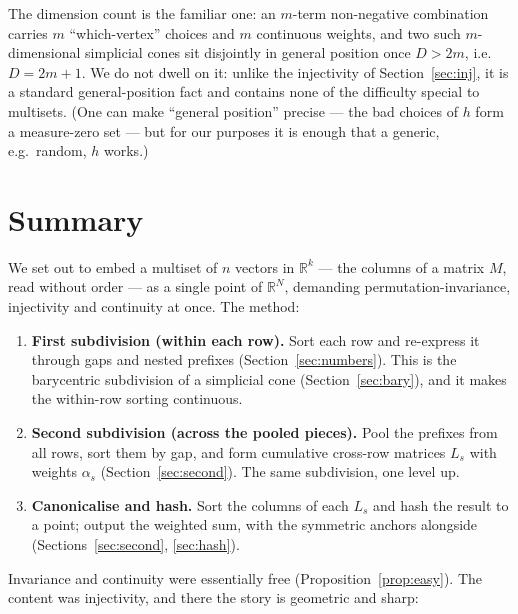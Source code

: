 \documentclass[11pt,a4paper]{article}
\theoremstyle{definition}
\theoremstyle{plain}
\newcommand{\R}{\mathbb{R}}
\begin{document}
\noindent
The dimension count is the familiar one: an $m$-term non-negative combination
carries $m$ ``which-vertex'' choices and $m$ continuous weights, and two such
$m$-dimensional simplicial cones sit disjointly in general position once
$D>2m$, i.e.\
$D=2m+1$. We do not dwell on it: unlike the injectivity of
Section~\ref{sec:inj}, it is a standard general-position fact and contains none
of the difficulty special to multisets. (One can make ``general position''
precise --- the bad choices of $h$ form a measure-zero set --- but for our
purposes it is enough that a generic, e.g.\ random, $h$ works.)

\section{Summary}
\label{sec:summary}

We set out to embed a multiset of $n$ vectors in $\R^k$ --- the columns of a
matrix $M$, read without order --- as a single point of $\R^N$, demanding
permutation-invariance, injectivity and continuity at once. The method:

\begin{enumerate}[leftmargin=*]
\item \textbf{First subdivision (within each row).} Sort each row and re-express
      it through gaps and nested prefixes (Section~\ref{sec:numbers}). This is
      the barycentric subdivision of a simplicial cone (Section~\ref{sec:bary}),
      and it makes the within-row sorting continuous.
\item \textbf{Second subdivision (across the pooled pieces).} Pool the prefixes
      from all rows, sort them by gap, and form cumulative cross-row matrices
      $L_s$ with weights $\alpha_s$ (Section~\ref{sec:second}). The same
      subdivision, one level up.
\item \textbf{Canonicalise and hash.} Sort the columns of each $L_s$ and hash
      the result to a point; output the weighted sum, with the symmetric anchors
      alongside (Sections~\ref{sec:second}, \ref{sec:hash}).
\end{enumerate}

Invariance and continuity were essentially free (Proposition~\ref{prop:easy}).
The content was injectivity, and there the story is geometric and sharp:
\end{document}
